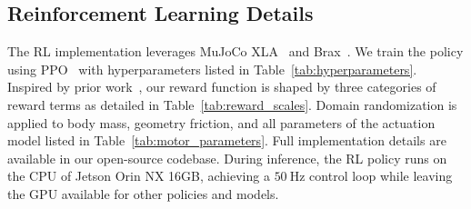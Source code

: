 \subsection{Reinforcement Learning Details}
\label{sec:rl_details}




The RL implementation leverages MuJoCo XLA~\citep{todorov2012mujoco} and Brax~\citep{brax2021github}. We train the policy using PPO~\citep{schulman2017proximal} with hyperparameters listed in Table~\ref{tab:hyperparameters}.
Inspired by prior work~\citep{gu2024humanoidgym, gu2024advancing}, our reward function is shaped by three categories of reward terms as detailed in Table~\ref{tab:reward_scales}. Domain randomization is applied to body mass, geometry friction, and all parameters of the actuation model listed in Table~\ref{tab:motor_parameters}. Full implementation details are available in our open-source codebase.
During inference, the RL policy runs on the CPU of Jetson Orin NX 16GB, achieving a $50~\mathrm{Hz}$ control loop while leaving the GPU available for other policies and models.